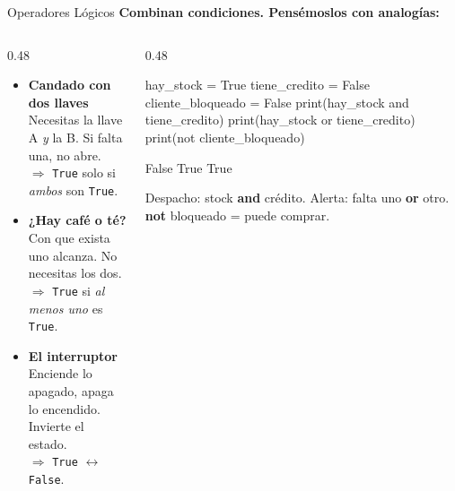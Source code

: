 \documentclass[aspectratio=169, 11pt]{beamer}
\begin{document}
\begin{frame}[fragile,shrink=25]{Operadores Lógicos}
  \vspace{-6pt}
  {\small\color{arcaDark}\bfseries
    Combinan condiciones. Pensémoslos con analogías:}

  \vspace{4pt}
  \begin{columns}[T]
    \begin{column}{0.48\textwidth}
      {\footnotesize
      \begin{itemize}\setlength{\itemsep}{6pt}
        \item[{\color{arcaRed}\bfseries and}]
          \textbf{Candado con dos llaves}\\
          {\scriptsize\color{textMuted}
            Necesitas la llave A \emph{y} la B.
            Si falta una, no abre.}
          \\[2pt]
          $\Rightarrow$ \texttt{True} solo si \emph{ambos} son \texttt{True}.

        \item[{\color{arcaRed}\bfseries or}]
          \textbf{¿Hay café o té?}\\
          {\scriptsize\color{textMuted}
            Con que exista uno alcanza.
            No necesitas los dos.}
          \\[2pt]
          $\Rightarrow$ \texttt{True} si \emph{al menos uno} es \texttt{True}.

        \item[{\color{arcaRed}\bfseries not}]
          \textbf{El interruptor}\\
          {\scriptsize\color{textMuted}
            Enciende lo apagado, apaga lo encendido.
            Invierte el estado.}
          \\[2pt]
          $\Rightarrow$ \texttt{True} $\leftrightarrow$ \texttt{False}.
      \end{itemize}
      }
    \end{column}

    \begin{column}{0.48\textwidth}
      \begin{pyblock}
hay_stock         = True
tiene_credito     = False
cliente_bloqueado = False
print(hay_stock and tiene_credito)
print(hay_stock or tiene_credito)
print(not cliente_bloqueado)
      \end{pyblock}
      \vspace{-2pt}
      \begin{outputblock}
False
True
True
      \end{outputblock}

      \vspace{4pt}
      {\scriptsize\color{textMuted}
        Despacho: stock \textbf{and} crédito.
        Alerta: falta uno \textbf{or} otro.
        \textbf{not} bloqueado = puede comprar.}
    \end{column}
  \end{columns}
\end{frame}
\end{document}
